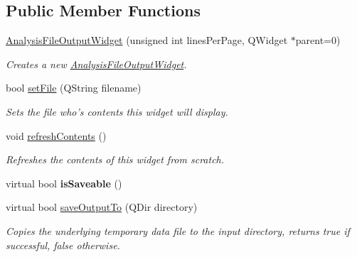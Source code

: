 \subsection*{Public Member Functions}
\begin{DoxyCompactItemize}
\item 
\hyperlink{class_picto_1_1_analysis_file_output_widget_abbad0997bb19606b8f24a887930b2690}{Analysis\-File\-Output\-Widget} (unsigned int lines\-Per\-Page, Q\-Widget $\ast$parent=0)
\begin{DoxyCompactList}\small\item\em Creates a new \hyperlink{class_picto_1_1_analysis_file_output_widget}{Analysis\-File\-Output\-Widget}. \end{DoxyCompactList}\item 
bool \hyperlink{class_picto_1_1_analysis_file_output_widget_a8002a150bec4dff309c9bd67ce414d31}{set\-File} (Q\-String filename)
\begin{DoxyCompactList}\small\item\em Sets the file who's contents this widget will display. \end{DoxyCompactList}\item 
\hypertarget{class_picto_1_1_analysis_file_output_widget_aa379ee7a121ee120cab6cba8d44f4d65}{void \hyperlink{class_picto_1_1_analysis_file_output_widget_aa379ee7a121ee120cab6cba8d44f4d65}{refresh\-Contents} ()}\label{class_picto_1_1_analysis_file_output_widget_aa379ee7a121ee120cab6cba8d44f4d65}

\begin{DoxyCompactList}\small\item\em Refreshes the contents of this widget from scratch. \end{DoxyCompactList}\item 
\hypertarget{class_picto_1_1_analysis_file_output_widget_aae8c790f95ab8bd1d9c0be25879b64df}{virtual bool {\bfseries is\-Saveable} ()}\label{class_picto_1_1_analysis_file_output_widget_aae8c790f95ab8bd1d9c0be25879b64df}

\item 
virtual bool \hyperlink{class_picto_1_1_analysis_file_output_widget_ad795bf5960ffd4d47a55733c2abefffb}{save\-Output\-To} (Q\-Dir directory)
\begin{DoxyCompactList}\small\item\em Copies the underlying temporary data file to the input directory, returns true if successful, false otherwise. \end{DoxyCompactList}\end{DoxyCompactItemize}


